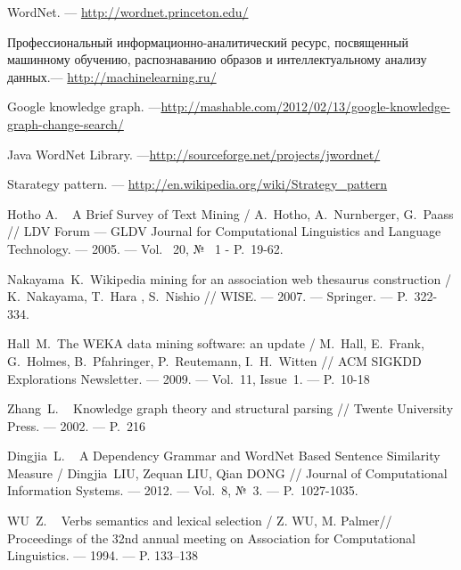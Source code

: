 WordNet. --- \url{http://wordnet.princeton.edu/}

Профессиональный информационно-аналитический ресурс, посвященный
машинному обучению, распознаванию образов и интеллектуальному анализу данных.--- \url{http://machinelearning.ru/}

Google knowledge graph. ---\url{http://mashable.com/2012/02/13/google-knowledge-graph-change-search/}

Java WordNet Library. ---\url{http://sourceforge.net/projects/jwordnet/}

Starategy pattern. --- \url{http://en.wikipedia.org/wiki/Strategy_pattern}

Hotho A. ~ 
A Brief Survey of Text Mining /
A.~Hotho, A.~Nurnberger, G.~Paass //  
LDV Forum --- GLDV Journal for Computational Linguistics
 and Language Technology. --- 2005. --- Vol.~ 20, № ~1 - P.~19-62.


Nakayama~K.~Wikipedia mining for an association web thesaurus construction /
K.~Nakayama, T.~Hara , S.~Nishio // WISE. --- 2007. --- Springer. --- P.~322-334.
 
Hall~M.~The WEKA data mining software: an update /
 M.~Hall, E.~Frank, G.~Holmes, B.~Pfahringer, P.~Reutemann, I.~H.~Witten // 
 ACM SIGKDD Explorations Newsletter. --- 2009. --- Vol.~11, Issue~1. --- P.~10-18 
 
Zhang~L. ~  Knowledge graph theory and structural parsing //
 Twente University Press. --- 2002. ---  P.~216

 
Dingjia~L. ~
A Dependency Grammar and WordNet Based Sentence Similarity Measure /
Dingjia~LIU, Zequan LIU, Qian DONG //
Journal of Computational Information Systems. --- 2012. ---
Vol.~8, №~3. --- P.~1027-1035.
 
WU~Z. ~
Verbs semantics and lexical selection /
 Z. WU, M. Palmer//
 Proceedings of the 32nd annual meeting on Association
for Computational Linguistics. --- 1994. --- P. 133--138
